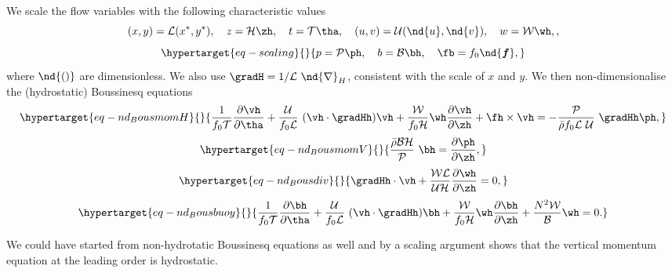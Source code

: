 \documentclass[
  letterpaper,
  twocolumn,
  landscape]{report}
\begin{document}
We scale the flow variables with the following characteristic values \[
   (x,y) = {\mathcal{L}}{({x^*},{y^*})}, \quad z = {\mathcal{H}}{\zh} , \quad t = {\mathcal{T}}{\tha} , \quad  (u,v) =  {\mathcal{U}}{(\nd{u},\nd{v})}, \quad w = {\mathcal{W}}{\wh},,
\] \begin{equation}\protect\hypertarget{eq-scaling}{}{
p = {\mathcal{P}}{\ph} , \quad b = {\mathcal{B}}{\bh} , \quad \fb = {f_0}{\nd{\boldsymbol{f}}} , 
}\label{eq-scaling}\end{equation} where \(\nd{()}\) are dimensionless.
We also use \(\gradH = 1/ \mathcal{L} \ \nd{\nabla}_H\), consistent with
the scale of \(x\) and \(y\). We then non-dimensionalise the
(hydrostatic) Boussinesq equations
\begin{equation}\protect\hypertarget{eq-nd_BousmomH}{}{
\frac{1}{f_0 \mathcal{T}} \frac{\partial\vh}{\partial \tha} + \frac{\mathcal{U}}{f_0 \mathcal{L}} \ (\vh \cdot \gradHh ) \vh + \frac{\mathcal{W}}{f_0 \mathcal{H}} \wh \frac{\partial \vh }{\partial \zh} + \fh \times \vh = - \frac{\mathcal{P}}{\bar\rho f_0 \mathcal{L}\ \mathcal{U} } \ \gradHh \ph,}\label{eq-nd_BousmomH}\end{equation}
\begin{equation}\protect\hypertarget{eq-nd_BousmomV}{}{ \frac{\bar\rho \mathcal{B} \mathcal{H}}{\mathcal{P}} \ \bh = \frac{\partial \ph }{\partial \zh} ,}\label{eq-nd_BousmomV}\end{equation}
\begin{equation}\protect\hypertarget{eq-nd_Bousdiv}{}{ \gradHh \cdot\vh + \frac{\mathcal{W} \mathcal{L}}{\mathcal{U} \mathcal{H}}  \frac{\partial \wh}{\partial \zh} =0, }\label{eq-nd_Bousdiv}\end{equation}
\begin{equation}\protect\hypertarget{eq-nd_Bousbuoy}{}{\frac{1}{f_0 \mathcal{T}} \frac{\partial \bh}{\partial \tha} + \frac{\mathcal{U}}{f_0 \mathcal{L}} \ (\vh\cdot\gradHh ) \bh + \frac{\mathcal{W}}{f_0 \mathcal{H}} \wh \frac{\partial \bh}{\partial \zh} + \frac{N^2 \mathcal{W}}{\mathcal{B}} \wh =0.}\label{eq-nd_Bousbuoy}\end{equation}

\begin{tcolorbox}[enhanced jigsaw, toprule=.15mm, left=2mm, opacityback=0, breakable, arc=.35mm, colback=white, rightrule=.15mm, bottomrule=.15mm, colframe=quarto-callout-note-color-frame, leftrule=.75mm]
\begin{minipage}[t]{5.5mm}
\textcolor{quarto-callout-note-color}{\faInfo}
\end{minipage}%
\begin{minipage}[t]{\textwidth - 5.5mm}

We could have started from non-hydrotatic Boussinesq equations as well
and by a scaling argument shows that the vertical momentum equation at
the leading order is hydrostatic.

\end{minipage}%
\end{tcolorbox}
\end{document}
